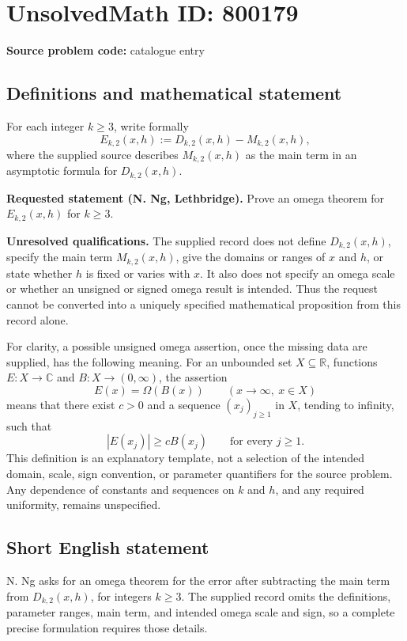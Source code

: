 \documentclass[11pt]{article}
\newcommand{\R}{\mathbb{R}}
\newcommand{\C}{\mathbb{C}}
\begin{document}
\section*{UnsolvedMath ID: 800179}
\textbf{Source problem code:} catalogue entry
\subsection{Definitions and mathematical statement}
For each integer \(k\ge 3\), write formally
\[
E_{k,2}(x,h):=D_{k,2}(x,h)-M_{k,2}(x,h),
\]
where the supplied source describes \(M_{k,2}(x,h)\) as the main term in an asymptotic formula for \(D_{k,2}(x,h)\).

\textbf{Requested statement (N. Ng, Lethbridge).} Prove an omega theorem for \(E_{k,2}(x,h)\) for \(k\ge 3\).

\textbf{Unresolved qualifications.} The supplied record does not define \(D_{k,2}(x,h)\), specify the main term \(M_{k,2}(x,h)\), give the domains or ranges of \(x\) and \(h\), or state whether \(h\) is fixed or varies with \(x\). It also does not specify an omega scale or whether an unsigned or signed omega result is intended. Thus the request cannot be converted into a uniquely specified mathematical proposition from this record alone.

For clarity, a possible unsigned omega assertion, once the missing data are supplied, has the following meaning. For an unbounded set \(X\subseteq\R\), functions \(E:X\to\C\) and \(B:X\to(0,\infty)\), the assertion
\[
E(x)=\Omega(B(x))\qquad(x\to\infty,\ x\in X)
\]
means that there exist \(c>0\) and a sequence \((x_j)_{j\ge1}\) in \(X\), tending to infinity, such that
\[
|E(x_j)|\ge cB(x_j)\qquad\text{for every }j\ge1.
\]
This definition is an explanatory template, not a selection of the intended domain, scale, sign convention, or parameter quantifiers for the source problem. Any dependence of constants and sequences on \(k\) and \(h\), and any required uniformity, remains unspecified.
\subsection{Short English statement}
N. Ng asks for an omega theorem for the error after subtracting the main term from \(D_{k,2}(x,h)\), for integers \(k\ge3\). The supplied record omits the definitions, parameter ranges, main term, and intended omega scale and sign, so a complete precise formulation requires those details.
\end{document}
